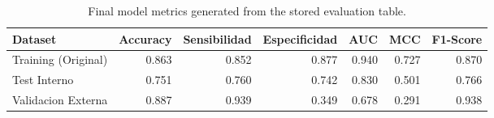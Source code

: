 \begin{table}[H]
\centering
\caption{Final model metrics generated from the stored evaluation table.}
\label{tab:py_final_metrics}
\begin{tabular}{lrrrrrr}
\toprule
Dataset & Accuracy & Sensibilidad & Especificidad & AUC & MCC & F1-Score \\
\midrule
Training (Original) & 0.863 & 0.852 & 0.877 & 0.940 & 0.727 & 0.870 \\
Test Interno & 0.751 & 0.760 & 0.742 & 0.830 & 0.501 & 0.766 \\
Validacion Externa & 0.887 & 0.939 & 0.349 & 0.678 & 0.291 & 0.938 \\
\bottomrule
\end{tabular}
\end{table}
